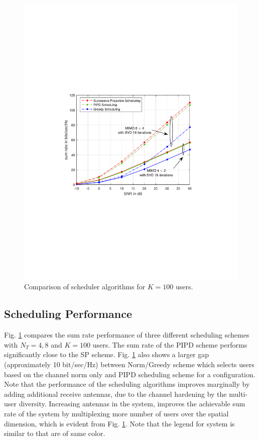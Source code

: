 \documentclass[conference,letterpaper,9pt]{./../IEEEtran}
\begin{document}
\begin{figure}
	\centering
	\includegraphics[trim=1.5in 3.5in 1.5in 3.5in,width=\columnwidth]{sra_100}
	\caption{Comparison of scheduler algorithms for $K = 100$ users.}
	\label{kuva:performance_plot}
	\vspace{-0.15in}
\end{figure}

\subsection{Scheduling Performance}
Fig. \ref{kuva:performance_plot} compares the sum rate performance of three different scheduling schemes with $N_T = 4,8$ and $K = 100$ users. The sum rate of the PIPD scheme performs significantly close to the SP scheme. Fig. \ref{kuva:performance_plot} also shows a larger gap (approximately 10 bit/sec/Hz) between Norm/Greedy scheme which selects users based on the channel norm only and PIPD scheduling scheme for a  configuration. Note that the performance of the scheduling algorithms improves marginally by adding additional receive antennas, due to the channel hardening by the multi-user diversity. Increasing  antennas in the system, improves the achievable sum rate of the system by multiplexing more number of users over the spatial dimension, which is evident from Fig. \ref{kuva:performance_plot}. Note that the legend for  system is similar to  that are of same color.
\end{document}
